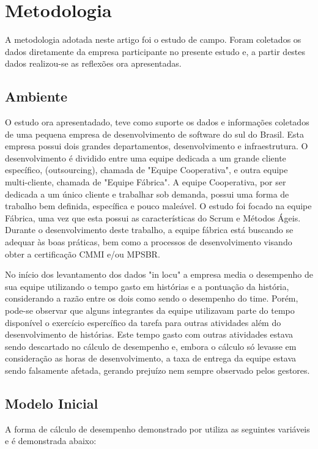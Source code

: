 \section{Metodologia}
A metodologia adotada neste artigo foi o estudo de campo. Foram coletados os dados diretamente da empresa participante no presente estudo e, a partir destes dados realizou-se as reflexões ora apresentadas.\par

\subsection{Ambiente}
O estudo ora apresentadado, teve como suporte os dados e informações coletados de uma pequena empresa de desenvolvimento de software do sul do Brasil. Esta empresa possui dois grandes departamentos, desenvolvimento e infraestrutura. O desenvolvimento é dividido entre uma equipe dedicada a um grande cliente específico,  (outsourcing), chamada de "Equipe Cooperativa", e outra equipe multi-cliente, chamada de "Equipe Fábrica". A equipe Cooperativa, por ser dedicada a um único cliente e trabalhar sob demanda, possui uma forma de trabalho bem definida, específica e pouco maleável. O estudo foi focado na equipe Fábrica, uma vez que esta possui as características do Scrum e Métodos Ágeis. Durante o desenvolvimento deste trabalho, a equipe fábrica está buscando se adequar às boas práticas, bem como a processos de desenvolvimento visando  obter a certificação CMMI e/ou MPSBR.\par
No início dos levantamento dos dados "in locu"  a empresa media o desempenho de sua equipe utilizando o tempo gasto em histórias e a pontuação da história, considerando a razão entre os dois como sendo o desempenho do time. Porém, pode-se observar que alguns integrantes da equipe utilizavam parte do tempo disponível o exercício espercífico da tarefa para outras atividades além do desenvolvimento de histórias. Este tempo gasto com outras atividades estava sendo descartado no cálculo de desempenho e, embora o cálculo só levasse em consideração as horas de desenvolvimento, a taxa de entrega da equipe estava sendo falsamente afetada, gerando prejuízo nem sempre observado pelos gestores.\par

\subsection{Modelo Inicial}
A forma de cálculo de desempenho demonstrado por \citeauthor{barbaran1998indicadores} utiliza as seguintes variáveis e é demonstrada abaixo:

